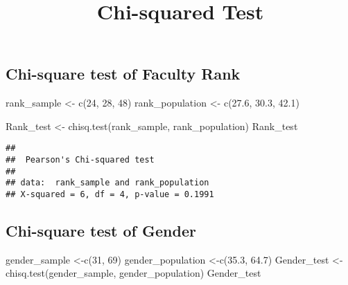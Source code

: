 \documentclass[]{article}
\title{Chi-squared Test}
\author{}
\date{}
\newenvironment{Shaded}{\begin{snugshade}}{\end{snugshade}}
\newcommand{\DecValTok}[1]{\textcolor[rgb]{0.00,0.00,0.81}{#1}}
\newcommand{\FloatTok}[1]{\textcolor[rgb]{0.00,0.00,0.81}{#1}}
\newcommand{\FunctionTok}[1]{\textcolor[rgb]{0.00,0.00,0.00}{#1}}
\newcommand{\NormalTok}[1]{#1}
\newcommand{\OtherTok}[1]{\textcolor[rgb]{0.56,0.35,0.01}{#1}}
\begin{document}
\maketitle

\hypertarget{chi-square-test-of-faculty-rank}{%
\subsection{Chi-square test of Faculty
Rank}\label{chi-square-test-of-faculty-rank}}

\begin{Shaded}
\begin{Highlighting}[]
\NormalTok{rank\_sample }\OtherTok{\textless{}{-}} \FunctionTok{c}\NormalTok{(}\DecValTok{24}\NormalTok{, }\DecValTok{28}\NormalTok{, }\DecValTok{48}\NormalTok{)}
\NormalTok{rank\_population }\OtherTok{\textless{}{-}} \FunctionTok{c}\NormalTok{(}\FloatTok{27.6}\NormalTok{, }\FloatTok{30.3}\NormalTok{, }\FloatTok{42.1}\NormalTok{)}

\NormalTok{Rank\_test }\OtherTok{\textless{}{-}} \FunctionTok{chisq.test}\NormalTok{(rank\_sample, rank\_population)}
\NormalTok{Rank\_test}
\end{Highlighting}
\end{Shaded}

\begin{verbatim}
## 
##  Pearson's Chi-squared test
## 
## data:  rank_sample and rank_population
## X-squared = 6, df = 4, p-value = 0.1991
\end{verbatim}

\hypertarget{chi-square-test-of-gender}{%
\subsection{Chi-square test of Gender}\label{chi-square-test-of-gender}}

\begin{Shaded}
\begin{Highlighting}[]
\NormalTok{gender\_sample }\OtherTok{\textless{}{-}}\FunctionTok{c}\NormalTok{(}\DecValTok{31}\NormalTok{, }\DecValTok{69}\NormalTok{)}
\NormalTok{gender\_population }\OtherTok{\textless{}{-}}\FunctionTok{c}\NormalTok{(}\FloatTok{35.3}\NormalTok{, }\FloatTok{64.7}\NormalTok{)}
\NormalTok{Gender\_test }\OtherTok{\textless{}{-}} \FunctionTok{chisq.test}\NormalTok{(gender\_sample, gender\_population)}
\NormalTok{Gender\_test}
\end{Highlighting}
\end{Shaded}
\end{document}
